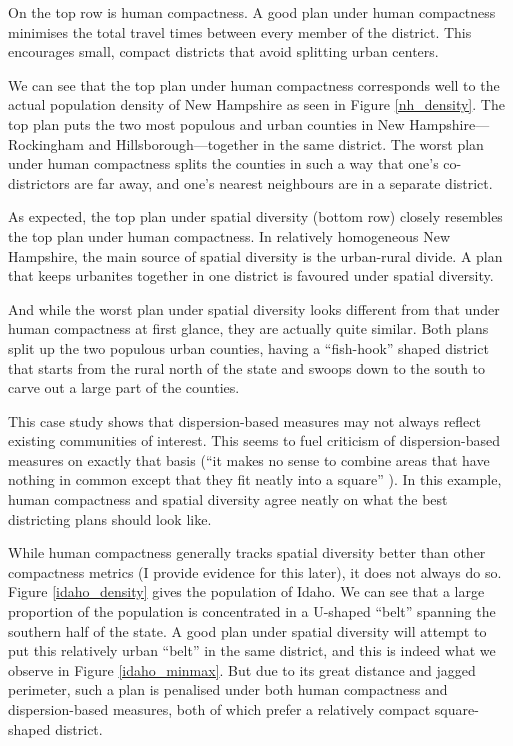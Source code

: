 \documentclass[]{article}
\begin{document}
On the top row is human compactness. A good plan under human compactness
minimises the total travel times between every member of the district.
This encourages small, compact districts that avoid splitting urban
centers.

We can see that the top plan under human compactness corresponds well to
the actual population density of New Hampshire as seen in Figure
\ref{nh_density}. The top plan puts the two most populous and urban
counties in New Hampshire---Rockingham and Hillsborough---together in
the same district. The worst plan under human compactness splits the
counties in such a way that one's co-districtors are far away, and one's
nearest neighbours are in a separate district.

As expected, the top plan under spatial diversity (bottom row) closely
resembles the top plan under human compactness. In relatively
homogeneous New Hampshire, the main source of spatial diversity is the
urban-rural divide. A plan that keeps urbanites together in one district
is favoured under spatial diversity.

And while the worst plan under spatial diversity looks different from
that under human compactness at first glance, they are actually quite
similar. Both plans split up the two populous urban counties, having a
``fish-hook'' shaped district that starts from the rural north of the
state and swoops down to the south to carve out a large part of the
counties.

This case study shows that dispersion-based measures may not always
reflect existing communities of interest. This seems to fuel criticism
of dispersion-based measures on exactly that basis (``it makes no sense
to combine areas that have nothing in common except that they fit neatly
into a square'' \citep{wolf2015}). In this example, human compactness
and spatial diversity agree neatly on what the best districting plans
should look like.

While human compactness generally tracks spatial diversity better than
other compactness metrics (I provide evidence for this later), it does
not always do so. Figure \ref{idaho_density} gives the population of
Idaho. We can see that a large proportion of the population is
concentrated in a U-shaped ``belt'' spanning the southern half of the
state. A good plan under spatial diversity will attempt to put this
relatively urban ``belt'' in the same district, and this is indeed what
we observe in Figure \ref{idaho_minmax}. But due to its great distance
and jagged perimeter, such a plan is penalised under both human
compactness and dispersion-based measures, both of which prefer a
relatively compact square-shaped district.
\end{document}
